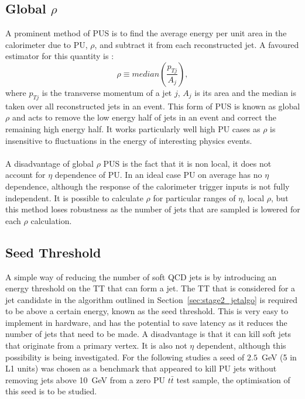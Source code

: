 \subsection{Global \boldmath $\rho$}
A prominent method of PUS is to find the average energy per unit area in the calorimeter due to PU, $\rho$, and subtract it from each reconstructed jet. A favoured estimator for this quantity is \cite{global_rho}:
\begin{equation}
\rho\equiv median(\frac{p_{Tj}}{A_j}),
\end{equation}
where $p_{Tj}$ is the transverse momentum of a jet $j$, $A_j$ is its area and the median is taken over all reconstructed jets in an event. This form of PUS is known as global $\rho$ and acts to remove the low energy half of jets in an event and correct the remaining high energy half. It works particularly well high PU cases as $\rho$ is insensitive to fluctuations in the energy of interesting physics events. 
\\\\
A disadvantage of global $\rho$ PUS is the fact that it is non local, it does not account for $\eta$ dependence of PU. In an ideal case PU on average has no $\eta$ dependence, although the response of the calorimeter trigger inputs is not fully independent. It is possible to calculate $\rho$ for particular ranges of $\eta$, local $\rho$, but this method loses robustness as the number of jets that are sampled is lowered for each $\rho$ calculation. 

\subsection{Seed Threshold}
A simple way of reducing the number of soft QCD jets is by introducing an energy threshold on the TT that can form a jet. The TT that is considered for a jet candidate in the algorithm outlined in Section~\ref{sec:stage2_jetalgo} is required to be above a certain energy, known as the seed threshold. This is very easy to implement in hardware, and has the potential to save latency as it reduces the number of jets that need to be made. A disadvantage is that it can kill soft jets that originate from a primary vertex. It is also not $\eta$ dependent, although this possibility is being investigated. For the following studies a seed of $2.5$~GeV (5 in L1 units) was chosen as a benchmark that appeared to kill PU jets without removing jets above 10~GeV from a zero PU $t\bar{t}$ test sample, the optimisation of this seed is to be studied. 


